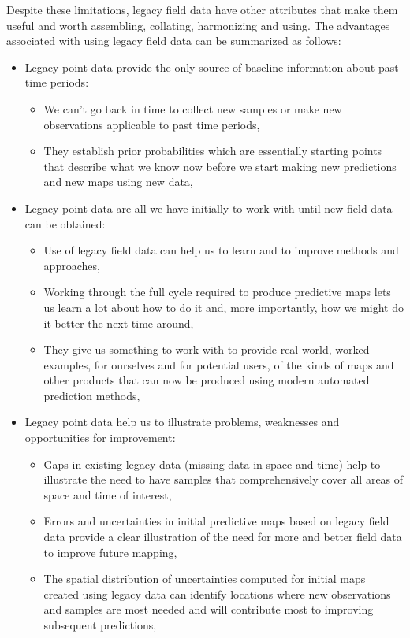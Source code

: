 \documentclass[graybox,natbib,nospthms,UStrade]{svmono}
\begin{document}
Despite these limitations, legacy field data have other attributes that
make them useful and worth assembling, collating, harmonizing and using.
The advantages associated with using legacy field data can be summarized
as follows:

\begin{itemize}
\item
  Legacy point data provide the only source of baseline information
  about past time periods:

  \begin{itemize}
  \item
    We can't go back in time to collect new samples or make new
    observations applicable to past time periods,
  \item
    They establish prior probabilities which are essentially
    starting points that describe what we know now before we start
    making new predictions and new maps using new data,
  \end{itemize}
\item
  Legacy point data are all we have initially to work with until new
  field data can be obtained:

  \begin{itemize}
  \item
    Use of legacy field data can help us to learn and to improve
    methods and approaches,
  \item
    Working through the full cycle required to produce predictive
    maps lets us learn a lot about how to do it and, more
    importantly, how we might do it better the next time around,
  \item
    They give us something to work with to provide real-world,
    worked examples, for ourselves and for potential users, of the
    kinds of maps and other products that can now be produced
    using modern automated prediction methods,
  \end{itemize}
\item
  Legacy point data help us to illustrate problems, weaknesses and
  opportunities for improvement:

  \begin{itemize}
  \item
    Gaps in existing legacy data (missing data in space and time)
    help to illustrate the need to have samples that
    comprehensively cover all areas of space and time of interest,
  \item
    Errors and uncertainties in initial predictive maps based on
    legacy field data provide a clear illustration of the need for
    more and better field data to improve future mapping,
  \item
    The spatial distribution of uncertainties computed for initial
    maps created using legacy data can identify locations where
    new observations and samples are most needed and will
    contribute most to improving subsequent predictions,
  \end{itemize}
\end{itemize}
\end{document}
